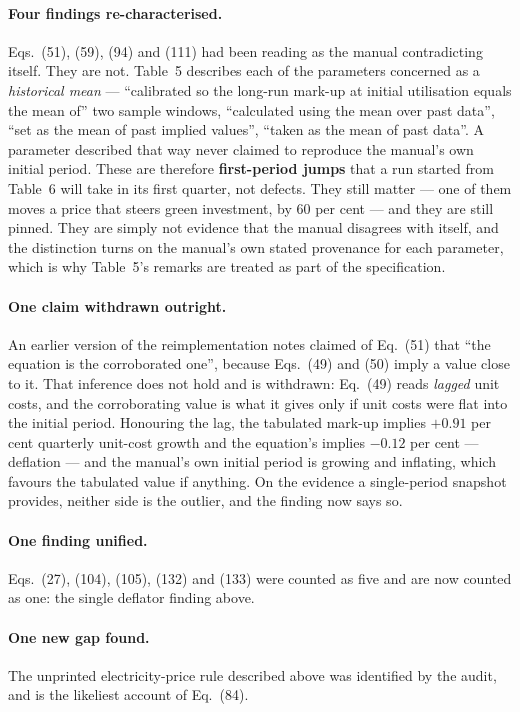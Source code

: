 \paragraph{Four findings re-characterised.} Eqs.~(51), (59), (94) and (111) had been reading as the manual contradicting itself. They are not. Table~5 describes each of the parameters concerned as a \emph{historical mean} --- ``calibrated so the long-run mark-up at initial utilisation equals the mean of'' two sample windows, ``calculated using the mean over past data'', ``set as the mean of past implied values'', ``taken as the mean of past data''. A parameter described that way never claimed to reproduce the manual's own initial period. These are therefore \textbf{first-period jumps} that a run started from Table~6 will take in its first quarter, not defects. They still matter --- one of them moves a price that steers green investment, by 60 per cent --- and they are still pinned. They are simply not evidence that the manual disagrees with itself, and the distinction turns on the manual's own stated provenance for each parameter, which is why Table~5's remarks are treated as part of the specification.

\paragraph{One claim withdrawn outright.} An earlier version of the reimplementation notes claimed of Eq.~(51) that ``the equation is the corroborated one'', because Eqs.~(49) and (50) imply a value close to it. That inference does not hold and is withdrawn: Eq.~(49) reads \emph{lagged} unit costs, and the corroborating value is what it gives only if unit costs were flat into the initial period. Honouring the lag, the tabulated mark-up implies $+0.91$ per cent quarterly unit-cost growth and the equation's implies $-0.12$ per cent --- deflation --- and the manual's own initial period is growing and inflating, which favours the tabulated value if anything. On the evidence a single-period snapshot provides, neither side is the outlier, and the finding now says so.

\paragraph{One finding unified.} Eqs.~(27), (104), (105), (132) and (133) were counted as five and are now counted as one: the single deflator finding above.

\paragraph{One new gap found.} The unprinted electricity-price rule described above was identified by the audit, and is the likeliest account of Eq.~(84).

